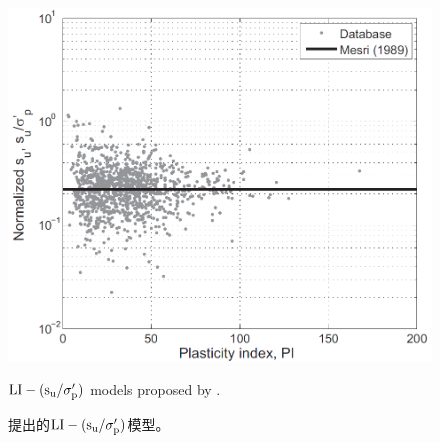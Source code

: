 \begin{figure}[!p]
\begin{minipage}[t]{0.48\textwidth}
        \includegraphics[width=\textwidth]{figures/figure-9.png}
        \caption{$\rm{LI}-(s_u/\sigma_p')$ models proposed by \citet{Mesri1975409, Mesri1989162}.}
        \vspace{-5pt}
        \addtocounter{figure}{-1}
        \renewcommand{\figurename}{图}
        \caption{\citet{Mesri1975409, Mesri1989162}提出的$\rm{LI}-(s_u/\sigma_p')$模型。}
        \label{figure:9}
        \renewcommand{\figurename}{Figure}
    \end{minipage}
\end{figure}

